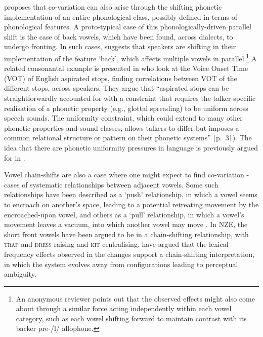 \documentclass[review]{elsarticle} %
\begin{document}
\cite{fruehwald2013phonological,fruehwald2017role} proposes that co-variation can also arise through the shifting phonetic implementation of an entire phonological class, possibly defined in terms of phonological features.   A proto-typical case of this phonologically-driven parallel shift is the case of back vowels, which have been found, across dialects, to undergo fronting.   In such cases, \cite{fruehwald2013phonological,fruehwald2017role} suggests that speakers are shifting in their implementation of the feature `back', which affects multiple vowels in parallel.\footnote{An anonymous reviewer points out that the observed effects might also come about through a similar force acting independently within each vowel category, such as each vowel shifting forward to maintain contrast with its backer pre-/l/ allophone.}   A related consonantal example is presented in \cite{chodroff2017structure} who look at the Voice Onset Time (VOT) of English aspirated stops, finding correlations between VOT of the different stops, across speakers.  They argue that ``aspirated stops can be straightforwardly accounted for with a constraint that requires the talker-specific realisation of a phonetic property (e.g., glottal spreading) to be uniform across speech sounds. The uniformity constraint, which could extend to many other phonetic properties and sound classes, allows talkers to differ but imposes a common relational structure or pattern on their phonetic systems'' (p.\ 31).  The idea that there are phonetic uniformity pressures in language is previously argued for in \cite{keating2003phonetic}. 

Vowel chain-shifts are also a case where one might expect to find co-variation - cases of systematic relationships between adjacent vowels.  Some such relationships have been described as a `push' relationship, in which a vowel seems to encroach on another's space, leading to a potential retreating movement by the encroached-upon vowel, and others as a `pull' relationship, in which a vowel's movement leaves a vacuum, into which another vowel may move \citep{gordon2002investigating, lubowicz2011chain}. In NZE, the short front vowels have been argued to be in a chain-shifting relationship, with \textsc{trap} and \textsc{dress} raising and \textsc{kit} centralising. \cite{hay2015tracking} have argued that the lexical frequency effects observed in the changes support a chain-shifting interpretation, in which the system evolves away from configurations leading to perceptual ambiguity. 
\end{document}
